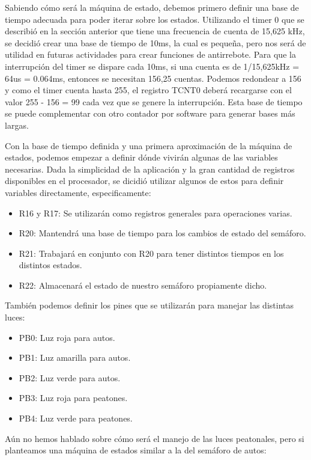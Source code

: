 \documentclass{article}
\begin{document}
Sabiendo cómo será la máquina de estado, debemos primero definir una base de
tiempo adecuada para poder iterar sobre los estados. Utilizando el timer 0
que se describió en la sección anterior que tiene una frecuencia de cuenta de
15,625 kHz, se decidió crear una base de tiempo de 10ms, la cual es pequeña,
pero nos será de utilidad en futuras actividades para crear funciones de
antirrebote. Para que la interrupción del timer se dispare cada 10ms,
si una cuenta es de 1/15,625kHz = 64us = 0.064ms, entonces se necesitan
156,25 cuentas. Podemos redondear a 156 y como el timer cuenta hasta 255,
el registro TCNT0 deberá recargarse con el valor 255 - 156 = 99 cada vez que
se genere la interrupción. Esta base de tiempo se puede complementar con otro
contador por software para generar bases más largas.

Con la base de tiempo definida y una primera aproximación de la máquina de
estados, podemos empezar a definir dónde vivirán algunas de las variables
necesarias. Dada la simplicidad de la aplicación y la gran cantidad de
registros disponibles en el procesador, se dicidió utilizar algunos de estos
para definir variables directamente, especificamente:

\begin{itemize}
    \item R16 y R17: Se utilizarán como registros generales para operaciones varias.
    \item R20: Mantendrá una base de tiempo para los cambios de estado del semáforo.
    \item R21: Trabajará en conjunto con R20 para tener distintos tiempos en los distintos estados.
    \item R22: Almacenará el estado de nuestro semáforo propiamente dicho.
\end{itemize}

También podemos definir los pines que se utilizarán para manejar las distintas
luces:

\begin{itemize}
    \item PB0: Luz roja para autos.
    \item PB1: Luz amarilla para autos.
    \item PB2: Luz verde para autos.
    \item PB3: Luz roja para peatones.
    \item PB4: Luz verde para peatones.
\end{itemize}

Aún no hemos hablado sobre cómo será el manejo de las luces peatonales, pero si
planteamos una máquina de estados similar a la del semáforo de autos:
\end{document}
